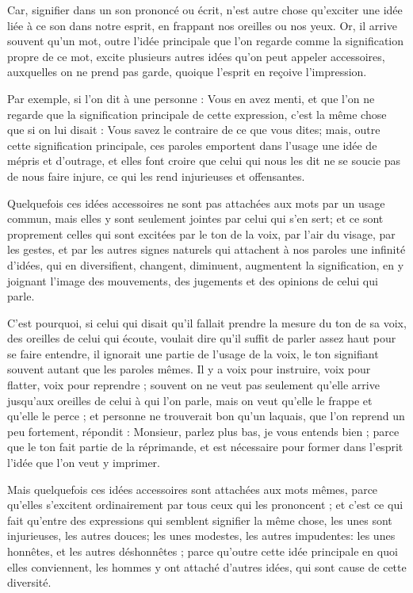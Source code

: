 Car, signifier dans un son prononcé ou écrit, n'est autre chose qu'exciter une idée liée à ce son dans notre esprit, en frappant nos oreilles ou nos yeux. Or, il arrive souvent qu'un mot, outre l'idée principale que l'on regarde comme la signification propre de ce mot, excite plusieurs autres idées qu'on peut appeler accessoires, auxquelles on ne prend pas garde, quoique l'esprit en reçoive l'impression.

Par exemple, si l'on dit à une personne : Vous en avez menti, et que l'on ne regarde que la signification principale de cette expression, c'est la même chose que si on lui disait : Vous savez le contraire de ce que vous dites; mais, outre cette signification principale, ces paroles emportent dans l'usage une idée de mépris et d'outrage, et elles font croire que celui qui nous les dit ne se soucie pas de nous faire injure, ce qui les rend injurieuses et offensantes.

Quelquefois ces idées accessoires ne sont pas attachées aux mots par un usage commun, mais elles y sont seulement jointes par celui qui s'en sert; et ce sont proprement celles qui sont excitées par le ton de la voix, par l'air du visage, par les gestes, et par les autres signes naturels qui attachent à nos paroles une infinité d'idées, qui en diversifient, changent, diminuent, augmentent la signification, en y joignant l'image des mouvements, des jugements et des opinions de celui qui parle.

C'est pourquoi, si celui qui disait qu'il fallait prendre la mesure du ton de sa voix, des oreilles de celui qui écoute, voulait dire qu'il suffit de parler assez haut pour se faire entendre, il ignorait une partie de l'usage de la voix, le ton signifiant souvent autant que les paroles mêmes. Il y a voix pour instruire, voix pour flatter, voix pour reprendre ; souvent on ne veut pas seulement qu'elle arrive jusqu'aux oreilles de celui à qui l'on parle, mais on veut qu'elle le frappe et qu'elle le perce ; et personne ne trouverait bon qu'un laquais, que l'on reprend un peu fortement, répondit : Monsieur, parlez plus bas, je vous entends bien ; parce que le ton fait partie de la réprimande, et est nécessaire pour former dans l'esprit l'idée que l'on veut y imprimer.

Mais quelquefois ces idées accessoires sont attachées aux mots mêmes, parce qu'elles s'excitent ordinairement par tous ceux qui les prononcent ; et c'est ce qui fait qu'entre des expressions qui semblent signifier la même chose, les unes sont injurieuses, les autres douces; les unes modestes, les autres impudentes: les unes honnêtes, et les autres déshonnêtes ; parce qu'outre cette idée principale en quoi elles conviennent, les hommes y ont attaché d'autres idées, qui sont cause de cette diversité.

